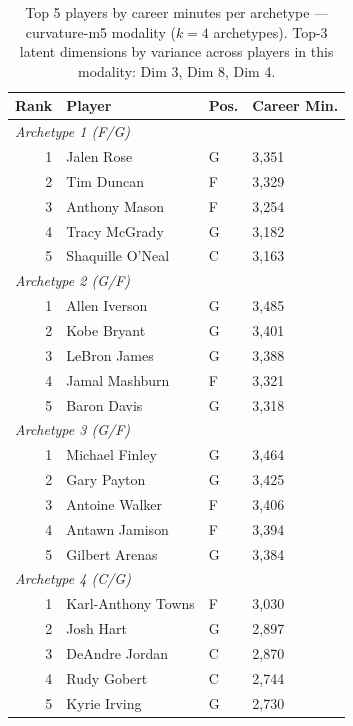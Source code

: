 \begin{table}[htbp]
  \centering\small
  \begin{tabular}{rlll}
    \toprule
    Rank & Player & Pos. & Career Min. \\
    \midrule
    \multicolumn{4}{l}{\textit{Archetype 1 (F/G)}} \\
    \midrule
    1 & Jalen Rose & G & 3,351 \\
    2 & Tim Duncan & F & 3,329 \\
    3 & Anthony Mason & F & 3,254 \\
    4 & Tracy McGrady & G & 3,182 \\
    5 & Shaquille O'Neal & C & 3,163 \\
    \midrule[0.4pt]
    \multicolumn{4}{l}{\textit{Archetype 2 (G/F)}} \\
    \midrule
    1 & Allen Iverson & G & 3,485 \\
    2 & Kobe Bryant & G & 3,401 \\
    3 & LeBron James & G & 3,388 \\
    4 & Jamal Mashburn & F & 3,321 \\
    5 & Baron Davis & G & 3,318 \\
    \midrule[0.4pt]
    \multicolumn{4}{l}{\textit{Archetype 3 (G/F)}} \\
    \midrule
    1 & Michael Finley & G & 3,464 \\
    2 & Gary Payton & G & 3,425 \\
    3 & Antoine Walker & F & 3,406 \\
    4 & Antawn Jamison & F & 3,394 \\
    5 & Gilbert Arenas & G & 3,384 \\
    \midrule[0.4pt]
    \multicolumn{4}{l}{\textit{Archetype 4 (C/G)}} \\
    \midrule
    1 & Karl-Anthony Towns & F & 3,030 \\
    2 & Josh Hart & G & 2,897 \\
    3 & DeAndre Jordan & C & 2,870 \\
    4 & Rudy Gobert & C & 2,744 \\
    5 & Kyrie Irving & G & 2,730 \\
    \bottomrule
  \end{tabular}
  \caption{Top 5 players by career minutes per archetype --- curvature-m5 modality ($k=4$ archetypes). Top-3 latent dimensions by variance across players in this modality: Dim 3, Dim 8, Dim 4.}
  \label{tab:arch_reps_curvature_m5}
\end{table}

